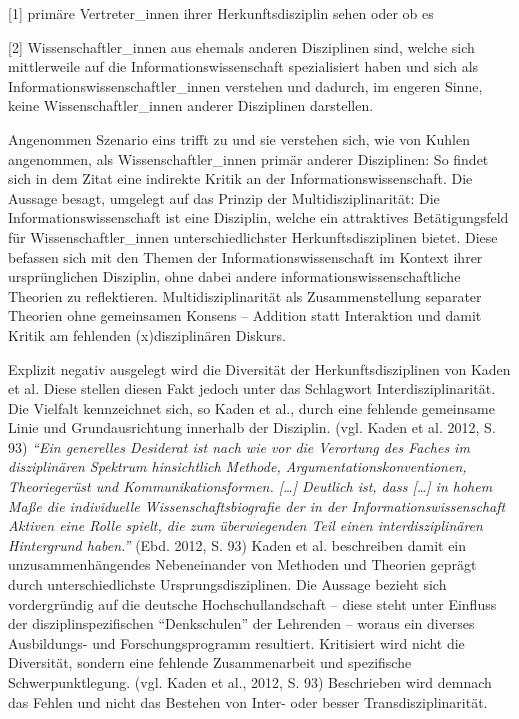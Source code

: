 \documentclass[a4paper,
fontsize=11pt,
oneside,
numbers=noperiodatend,
parskip=half-,
bibliography=totoc,
final
]{scrartcl}
\begin{document}
{[}1{]} primäre Vertreter\_innen ihrer Herkunftsdisziplin sehen oder ob
es

{[}2{]} Wissenschaftler\_innen aus ehemals anderen Disziplinen sind,
welche sich mittlerweile auf die Informationswissenschaft spezialisiert
haben und sich als Informationswissenschaftler\_innen verstehen und
dadurch, im engeren Sinne, keine Wissenschaftler\_innen anderer
Disziplinen darstellen.

Angenommen Szenario eins trifft zu und sie verstehen sich, wie von
Kuhlen angenommen, als Wissenschaftler\_innen primär anderer
Disziplinen: So findet sich in dem Zitat eine indirekte Kritik an der
Informationswissenschaft. Die Aussage besagt, umgelegt auf das Prinzip
der Multidisziplinarität: Die Informationswissenschaft ist eine
Disziplin, welche ein attraktives Betätigungsfeld für
Wissenschaftler\_innen unterschiedlichster Herkunftsdisziplinen bietet.
Diese befassen sich mit den Themen der Informationswissenschaft im
Kontext ihrer ursprünglichen Disziplin, ohne dabei andere
informationswissenschaftliche Theorien zu reflektieren.
Multidisziplinarität als Zusammenstellung separater Theorien ohne
gemeinsamen Konsens -- Addition statt Interaktion und damit Kritik am
fehlenden (x)disziplinären Diskurs.

Explizit negativ ausgelegt wird die Diversität der Herkunftsdisziplinen
von Kaden et al. Diese stellen diesen Fakt jedoch unter das Schlagwort
Interdisziplinarität. Die Vielfalt kennzeichnet sich, so Kaden et al.,
durch eine fehlende gemeinsame Linie und Grundausrichtung innerhalb der
Disziplin. (vgl. Kaden et al. 2012, S. 93) \emph{\enquote{Ein generelles
Desiderat ist nach wie vor die Verortung des Faches im disziplinären
Spektrum hinsichtlich Methode, Argumentationskonventionen, Theoriegerüst
und Kommunikationsformen. {[}\ldots{}{]} Deutlich ist, dass
{[}\ldots{}{]} in hohem Maße die individuelle Wissenschaftsbiografie der
in der Informationswissenschaft Aktiven eine Rolle spielt, die zum
überwiegenden Teil einen interdisziplinären Hintergrund haben.}} (Ebd.
2012, S. 93) Kaden et al. beschreiben damit ein unzusammenhängendes
Nebeneinander von Methoden und Theorien geprägt durch unterschiedlichste
Ursprungsdisziplinen. Die Aussage bezieht sich vordergründig auf die
deutsche Hochschullandschaft -- diese steht unter Einfluss der
disziplinspezifischen \enquote{Denkschulen} der Lehrenden -- woraus ein
diverses Ausbildungs- und Forschungsprogramm resultiert. Kritisiert wird
nicht die Diversität, sondern eine fehlende Zusammenarbeit und
spezifische Schwerpunktlegung. (vgl. Kaden et al., 2012, S. 93)
Beschrieben wird demnach das Fehlen und nicht das Bestehen von Inter-
oder besser Transdisziplinarität.
\end{document}
